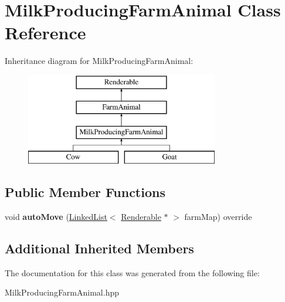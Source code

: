 \hypertarget{class_milk_producing_farm_animal}{}\section{Milk\+Producing\+Farm\+Animal Class Reference}
\label{class_milk_producing_farm_animal}
Inheritance diagram for Milk\+Producing\+Farm\+Animal\+:\begin{figure}[H]
\begin{center}
\leavevmode
\includegraphics[height=4.000000cm]{class_milk_producing_farm_animal}
\end{center}
\end{figure}
\subsection*{Public Member Functions}
\begin{DoxyCompactItemize}
\item 
\mbox{\label{class_milk_producing_farm_animal_adb26c26c7858ff765c92e770f3fcbb63}} 
void {\bfseries auto\+Move} (\mbox{\hyperlink{class_linked_list}{Linked\+List}}$<$ \mbox{\hyperlink{class_renderable}{Renderable}} $\ast$ $>$ farm\+Map) override
\end{DoxyCompactItemize}
\subsection*{Additional Inherited Members}


The documentation for this class was generated from the following file\+:\begin{DoxyCompactItemize}
\item 
Milk\+Producing\+Farm\+Animal.\+hpp\end{DoxyCompactItemize}
